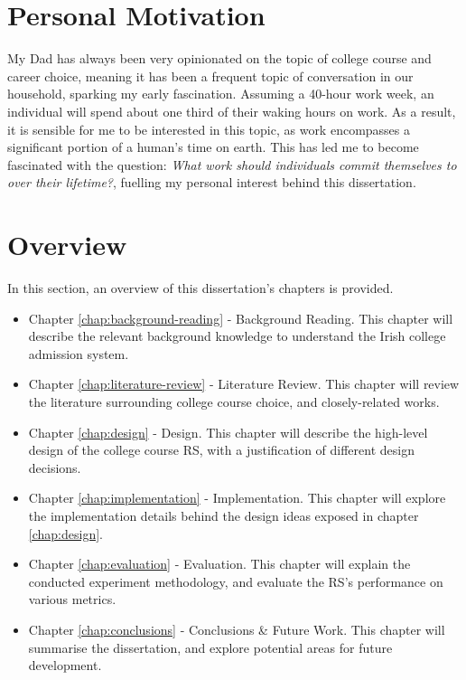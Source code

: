 \section{Personal Motivation}

My Dad has always been very opinionated on the topic of college course and career choice,
meaning it has been a frequent topic of conversation in our household,
sparking my early fascination.
Assuming a 40-hour work week,
an individual will spend about one third of their waking hours on work.
As a result, it is sensible for me to be interested in this topic,
as work encompasses a significant portion of a human's time on earth.
This has led me to become fascinated with the question:
\emph{What work should individuals commit themselves to over their lifetime?},
fuelling my personal interest behind this dissertation.

\section{Overview}

In this section, an overview of this dissertation's chapters is provided.

\begin{itemize}
    \item Chapter \ref{chap:background-reading} - Background Reading. This chapter will describe the relevant background knowledge to understand the Irish college admission system.
    \item Chapter \ref{chap:literature-review} - Literature Review. This chapter will review the literature surrounding college course choice, and closely-related works.
    \item Chapter \ref{chap:design} - Design. This chapter will describe the high-level design of the college course RS, with a justification of different design decisions.
    \item Chapter \ref{chap:implementation} - Implementation. This chapter will explore the implementation details behind the design ideas exposed in chapter \ref{chap:design}.
    \item Chapter \ref{chap:evaluation} - Evaluation. This chapter will explain the conducted experiment methodology, and evaluate the RS's performance on various metrics.
    \item Chapter \ref{chap:conclusions} - Conclusions \& Future Work. This chapter will summarise the dissertation, and explore potential areas for future development.
\end{itemize}
